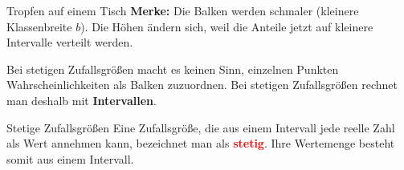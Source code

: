 \begin{bsp}{Tropfen auf einem Tisch}{}
\textbf{Merke:} Die Balken werden schmaler (kleinere Klassenbreite $b$). Die Höhen ändern sich, weil die Anteile jetzt auf kleinere Intervalle verteilt werden.


\begin{center}
\end{center}
\end{bsp}
Bei stetigen Zufallsgrößen macht es keinen Sinn, einzelnen Punkten Wahrscheinlichkeiten als Balken zuzuordnen. Bei stetigen Zufallsgrößen rechnet man deshalb mit \textbf{Intervallen}.
\begin{defi}{Stetige Zufallsgrößen}{}
    Eine Zufallsgröße, die aus einem Intervall jede reelle Zahl als Wert annehmen kann, bezeichnet man als \textbf{\textcolor{red}{stetig}}. Ihre Wertemenge besteht somit aus einem Intervall.
\end{defi}
